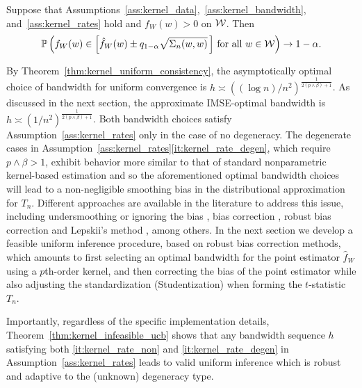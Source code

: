 \begin{theorem}
  \label{thm:kernel_infeasible_ucb}

  Suppose that Assumptions~\ref{ass:kernel_data},~\ref{ass:kernel_bandwidth},
  and~\ref{ass:kernel_rates} hold and $f_W(w) > 0$ on $\mathcal{W}$. Then
  \begin{align*}
    \mathbb{P}\left(
      f_W(w) \in
      \left[ \hat f_W(w) \pm q_{1-\alpha} \sqrt{\Sigma_n(w,w)} \, \right]
      \, \textup{for all } w \in \mathcal{W}
    \right)
    \to 1 - \alpha.
  \end{align*}
\end{theorem}

By Theorem~\ref{thm:kernel_uniform_consistency}, the asymptotically optimal
choice of
bandwidth for uniform convergence is
$h \asymp ((\log n)/n^2)^{\frac{1}{2(p \wedge \beta)+1}}$.
As discussed in the next section, the approximate
IMSE-optimal bandwidth is $h \asymp (1/n^2)^{\frac{1}{2(p \wedge \beta)+1}}$.
Both bandwidth choices satisfy Assumption~\ref{ass:kernel_rates} only in the
case of
no degeneracy. The degenerate cases in
Assumption~\ref{ass:kernel_rates}\ref{it:kernel_rate_degen}, which require
$p \wedge \beta > 1$, exhibit behavior more similar to that of standard
nonparametric kernel-based estimation and so the aforementioned optimal
bandwidth choices will lead to a non-negligible smoothing bias in the
distributional approximation for $T_n$. Different approaches are available in
the literature to address this issue, including undersmoothing or ignoring the
bias \citep{hall2001bootstrapping}, bias correction \citep{hall1992effect},
robust bias correction \citep{calonico2018effect, calonico2022coverage} and
Lepskii's method
\citep{lepskii1992asymptotically,birge2001alternative}, among others. In the
next section we develop a feasible uniform inference procedure, based on robust
bias correction methods, which amounts to first selecting an optimal bandwidth
for the point estimator $\hat{f}_W$ using a $p$th-order kernel, and then
correcting the bias of the point estimator while also adjusting the
standardization (Studentization) when forming the $t$-statistic $T_n$.

Importantly, regardless of the specific implementation details,
Theorem~\ref{thm:kernel_infeasible_ucb} shows that any bandwidth sequence $h$
satisfying both \ref{it:kernel_rate_non} and \ref{it:kernel_rate_degen}
in Assumption~\ref{ass:kernel_rates} leads to valid uniform inference which is
robust
and adaptive to the (unknown) degeneracy type.

